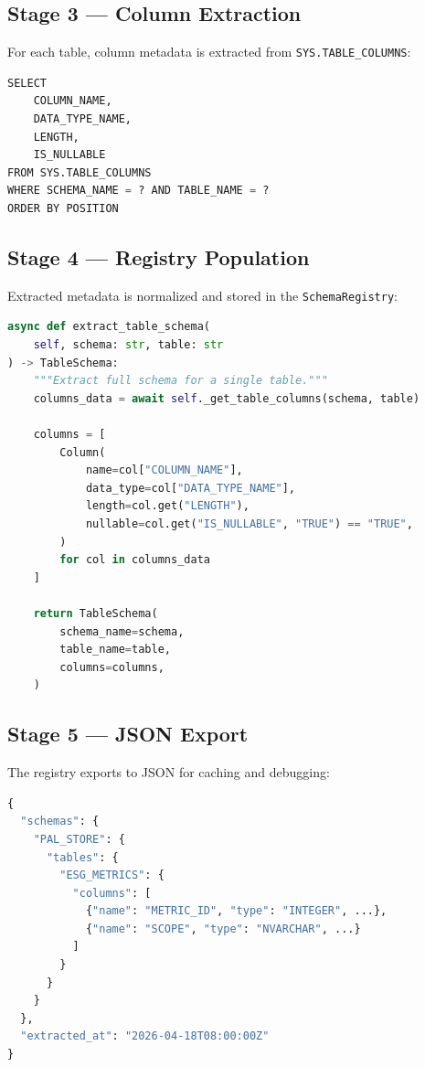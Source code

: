 \documentclass[11pt,a4paper]{article}
\begin{document}
\subsection{Stage 3 --- Column Extraction}

For each table, column metadata is extracted from \texttt{SYS.TABLE\_COLUMNS}:

\begin{lstlisting}[language=Python,caption={Column extraction SQL}]
SELECT 
    COLUMN_NAME,
    DATA_TYPE_NAME,
    LENGTH,
    IS_NULLABLE
FROM SYS.TABLE_COLUMNS
WHERE SCHEMA_NAME = ? AND TABLE_NAME = ?
ORDER BY POSITION
\end{lstlisting}

\subsection{Stage 4 --- Registry Population}

Extracted metadata is normalized and stored in the \texttt{SchemaRegistry}:

\begin{lstlisting}[language=Python,caption={Registry population (hana\_schema\_extractor.py, lines 140--165)}]
async def extract_table_schema(
    self, schema: str, table: str
) -> TableSchema:
    """Extract full schema for a single table."""
    columns_data = await self._get_table_columns(schema, table)
    
    columns = [
        Column(
            name=col["COLUMN_NAME"],
            data_type=col["DATA_TYPE_NAME"],
            length=col.get("LENGTH"),
            nullable=col.get("IS_NULLABLE", "TRUE") == "TRUE",
        )
        for col in columns_data
    ]
    
    return TableSchema(
        schema_name=schema,
        table_name=table,
        columns=columns,
    )
\end{lstlisting}

\subsection{Stage 5 --- JSON Export}

The registry exports to JSON for caching and debugging:

\begin{lstlisting}[language=Python,caption={JSON export format}]
{
  "schemas": {
    "PAL_STORE": {
      "tables": {
        "ESG_METRICS": {
          "columns": [
            {"name": "METRIC_ID", "type": "INTEGER", ...},
            {"name": "SCOPE", "type": "NVARCHAR", ...}
          ]
        }
      }
    }
  },
  "extracted_at": "2026-04-18T08:00:00Z"
}
\end{lstlisting}
\end{document}
